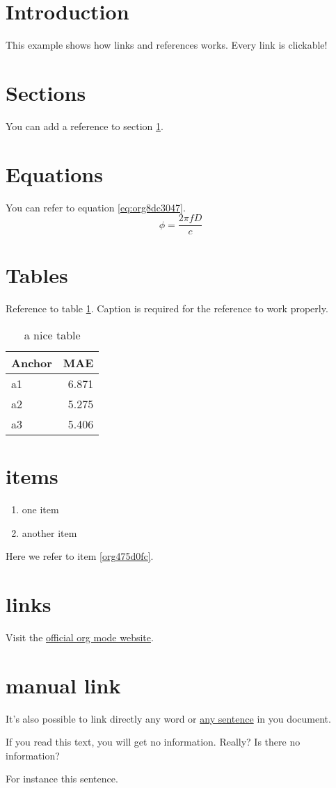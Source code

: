 


\section{Introduction}
\label{sec:orgaec195f}
This example shows how links and references works.
Every link is clickable!

\section{Sections}
\label{sec:orgb7f0cba}
You can add a reference to section \ref{sec:orgaec195f}.

\section{Equations}
\label{sec:org0575639}
You can refer to equation \ref{eq:org8dc3047}.
\begin{equation}
\label{eq:org8dc3047}
\phi = \frac{2\pi fD}{c}
\end{equation}

\section{Tables}
\label{sec:orga048b1d}
Reference to table \ref{tab:orgbcaebe4}.
Caption is required for the reference to work properly.

\begin{table}[htbp]
\caption{\label{tab:orgbcaebe4}
a nice table}
\centering
\begin{tabular}{lr}
Anchor & MAE\\
\hline
a1 & 6.871\\
a2 & 5.275\\
a3 & 5.406\\
\end{tabular}
\end{table}

\section{items}
\label{sec:org2cc2c18}
\begin{enumerate}
\item one item
\item \label{org475d0fc}another item
\end{enumerate}
Here we refer to item \ref{org475d0fc}.

\section{links}
\label{sec:org2b48e0d}
Visit the \href{https://orgmode.org/}{official org mode website}.

\section{manual link}
\label{sec:org6189685}
It's also possible to link directly any word
or \hyperlink{thesentence}{any sentence} in you document.

If you read this text, you will get no information.  Really?
Is there no information?

For instance \hypertarget{thesentence}{this sentence}.


